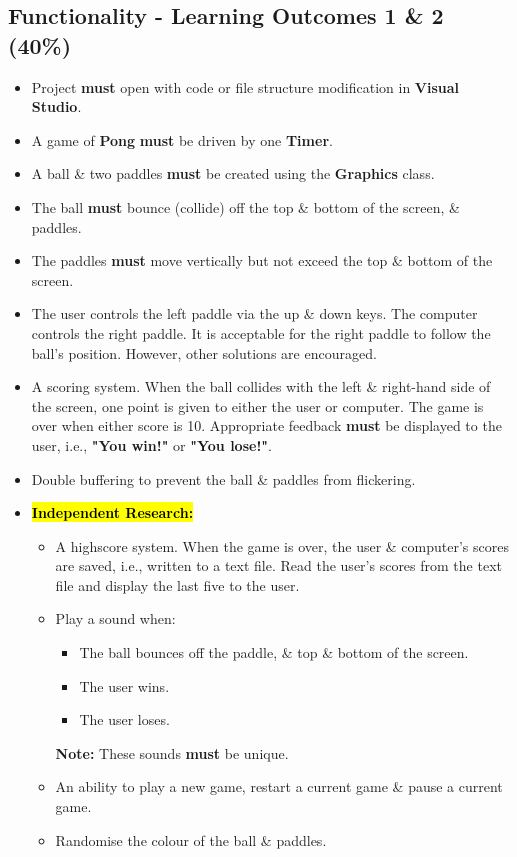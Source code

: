 \documentclass{article}
\begin{document}
\subsection*{Functionality - Learning Outcomes 1 \& 2 (40\%)}
\begin{itemize}
    \item Project \textbf{must} open with code or file structure modification in \textbf{Visual Studio}.
    \item A game of \textbf{Pong} \textbf{must} be driven by one \textbf{Timer}.
    \item A ball \& two paddles \textbf{must} be created using the \textbf{Graphics} class.
    \item The ball \textbf{must} bounce (collide) off the top \& bottom of the screen, \& paddles.
    \item The paddles \textbf{must} move vertically but not exceed the top \& bottom of the screen.
    \item The user controls the left paddle via the up \& down keys. The computer controls the right paddle. It is acceptable for the right paddle to follow the ball's position. However, other solutions are encouraged.
    \item A scoring system. When the ball collides with the left \& right-hand side of the screen, one point is given to either the user or computer. The game is over when either score is 10. Appropriate feedback \textbf{must} be displayed to the user, i.e., \textbf{"You win!"} or \textbf{"You lose!"}.
    \item Double buffering to prevent the ball \& paddles from flickering.
    \item \hl{\textbf{Independent Research:}}
    \begin{itemize}
        \item A highscore system. When the game is over, the user \& computer's scores are saved, i.e., written to a text file. Read the user's scores from the text file and display the last five to the user.
        \item Play a sound when:
        \begin{itemize}
            \item The ball bounces off the paddle, \& top \& bottom of the screen.
            \item The user wins.
            \item The user loses.
        \end{itemize}
        \textbf{Note:} These sounds \textbf{must} be unique.
        \item An ability to play a new game, restart a current game \& pause a current game.
        \item Randomise the colour of the ball \& paddles.
    \end{itemize}
\end{itemize}
\end{document}
